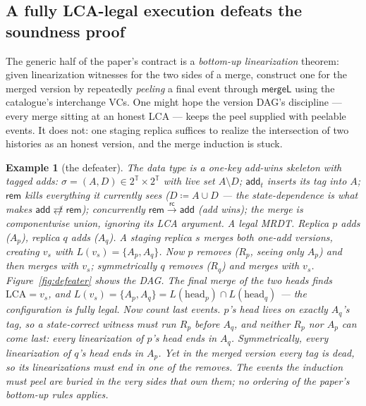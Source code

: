 \documentclass[11pt]{article}
\newtheorem{example}[theorem]{Example}
\newcommand{\rc}{\xrightarrow{\mathsf{rc}}}
\newcommand{\ncomm}{\not\rightleftarrows}
\newcommand{\add}{\mathsf{add}}
\newcommand{\rem}{\mathsf{rem}}
\newcommand{\mergeL}{\mathsf{mergeL}}
\begin{document}
\subsection{A fully LCA-legal execution defeats the soundness proof}
\label{sec:defeater}

The generic half of the paper's contract is a \emph{bottom-up
linearization} theorem: given linearization witnesses for the two sides
of a merge, construct one for the merged version by repeatedly
\emph{peeling} a final event through $\mergeL$ using the catalogue's
interchange VCs. One might hope the version DAG's discipline --- every
merge sitting at an honest LCA --- keeps the peel supplied with peelable
events. It does not: one staging replica suffices to realize the
intersection of two histories as an honest version, and the merge
induction is stuck.

\begin{example}[the defeater]
\label{ex:defeater}
The data type is a one-key add-wins skeleton with tagged adds:
$\sigma = (A, D) \in 2^{\mathbb{T}} \times 2^{\mathbb{T}}$ with live set
$A \setminus D$; $\add_t$ inserts its tag into $A$; $\rem$ kills
everything it currently sees ($D \coloneqq A \cup D$ --- the
state-dependence is what makes $\add \ncomm \rem$); concurrently
$\rem \rc \add$ (add wins); the merge is componentwise union, ignoring
its LCA argument. A legal MRDT.
Replica $p$ adds ($A_p$), replica $q$ adds ($A_q$). A staging replica $s$
merges both one-add versions, creating $v_s$ with
$L(v_s) = \{A_p, A_q\}$. Now $p$ removes ($R_p$, seeing only $A_p$) and
then merges with $v_s$; symmetrically $q$ removes ($R_q$) and merges with
$v_s$. Figure~\ref{fig:defeater} shows the DAG. The final merge of the two
heads finds $\mathrm{LCA} = v_s$, and
$L(v_s) = \{A_p,A_q\} = L(\text{head}_p) \cap L(\text{head}_q)$ --- the
configuration is fully legal. Now count last events. $p$'s head lives on
exactly $A_q$'s tag, so a state-correct witness must run $R_p$ before
$A_q$, and neither $R_p$ nor $A_p$ can come last: every linearization of
$p$'s head ends in $A_q$. Symmetrically, every linearization of $q$'s
head ends in $A_p$. Yet in the \emph{merged} version every tag is dead,
so its linearizations must end in one of the removes.
The events the induction must peel are \emph{buried} in the very sides
that own them; no ordering of the paper's bottom-up rules applies.
\end{example}
\end{document}
